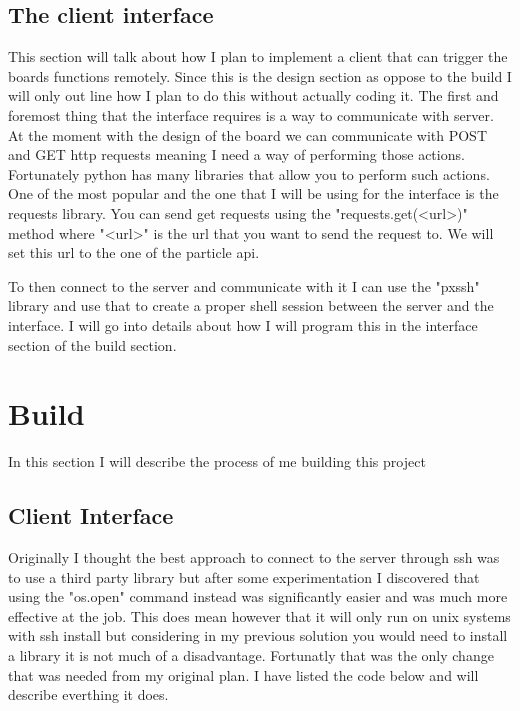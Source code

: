 \documentclass{article}
\newcommand\mylstcaption{}
\begin{document}
\subsection{The client interface}
This section will talk about how I plan to implement a client that can trigger the boards functions
remotely. Since this is the design section as oppose to the build I will only out line how I plan to
do this without actually coding it. The first and foremost thing that the interface requires is a
way to communicate with server. At the moment with the design of the board we can communicate with
POST and GET http requests meaning I need a way of performing those actions. Fortunately python has
many libraries that allow you to perform such actions. One of the most popular and the one that I
will be using for the interface is the requests library\cite{pythonRequests}. You can send get
requests using the "requests.get(<url>)" method where "<url>" is the url that you want to send the
request to. We will set this url to the one of the particle api.

To then connect to the server and communicate with it I can use the "pxssh" library and use that to
create a proper shell session between the server and the interface. I will go into details about
how I will program this in the interface section of the build section.


\section{Build}
In this section I will describe the process of me building this project

\subsection{Client Interface}
Originally I thought the best approach to connect to the server through ssh was to use a third party library
but after some experimentation I discovered that using the "os.open" command instead was significantly
easier and was much more effective at the job. This does mean however that it will only run on unix systems
with ssh install but considering in my previous solution you would need to install a library it is not
much of a disadvantage. Fortunatly that was the only change that was needed from my original plan. I have
listed the code below and will describe everthing it does.

\begin{mdlisting}
        
\end{mdlisting}
\end{document}
